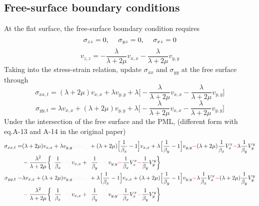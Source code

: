 \documentclass{article}
\newcommand{\myno}[1]{{\color{blue}#1}}
\newcommand{\mynno}[1]{{\color{red}#1}}
\newcommand{\myde}[1]{{\color{white!45!lightgray!55}#1}}
\begin{document}
\subsection{Free-surface boundary conditions}
At the flat surface, the free-surface boundary condition requires
\[ \sigma_{zz}=0 \text{,\hspace{5mm}} \sigma_{yz}=0 \text{,\hspace{5mm}} \sigma_{xz}=0 \]
\[ v_{z,z}=-\frac{\lambda}{\lambda+2\mu}v_{x,x}-\frac{\lambda}{\lambda+2\mu}v_{y,y} \]
Taking into the stress-strain relation, update $\sigma_{xx}$ and $\sigma_{yy}$ at the free surface through
\[ \sigma_{xx,t}=(\lambda+2\mu)v_{x,x}+\lambda v_{y,y}+\lambda\Big[-\frac{\lambda}{\lambda+2\mu}v_{x,x}-\frac{\lambda}{\lambda+2\mu}v_{y,y}\Big] \]
\[ \sigma_{yy,t}=\lambda v_{x,x}+(\lambda+2\mu)v_{y,y}+\lambda\Big[-\frac{\lambda}{\lambda+2\mu}v_{x,x}-\frac{\lambda}{\lambda+2\mu}v_{y,y}\Big] \]
Under the intersection of the free surface and the PML, \myno{(different form with eq.A-13 and A-14 in the original paper)}
\begin{align*}
  \sigma_{xx,t}= & (\lambda+2\mu)v_{x,x}+\lambda v_{y,y} \myde{+\lambda v_{z,z}} +(\lambda+2\mu)\Big[\frac{1}{\beta_x}-1\Big]v_{x,x}+\lambda\Big[\frac{1}{\beta_y}-1\Big]v_{y,y} \mynno{-} (\lambda+2\mu)\frac{1}{\beta_x}V_x^x \mynno{-} \lambda\frac{1}{\beta_y}V_y^y \\
    & -\frac{\lambda^2}{\lambda+2\mu}\bigg\{ \myde{\Big[} \frac{1}{\beta_x} \myde{-1\Big]} v_{x,x}+ \myde{\Big[} \frac{1}{\beta_y} \myde{-1\Big]} v_{y,y} \mynno{-} \frac{1}{\beta_x}V_x^x \mynno{-} \frac{1}{\beta_y}V_y^y\bigg\} \\
  \sigma_{yy,t}= & \lambda v_{x,x}+(\lambda+2\mu)v_{y,y} \myde{+\lambda v_{z,z}} +\lambda\Big[\frac{1}{\beta_x}-1\Big]v_{x,x}+(\lambda+2\mu)\Big[\frac{1}{\beta_y}-1\Big]v_{y,y} \mynno{-} \lambda\frac{1}{\beta_x}V_x^x \mynno{-} (\lambda+2\mu)\frac{1}{\beta_y}V_y^y \\
    & -\frac{\lambda^2}{\lambda+2\mu}\bigg\{ \myde{\Big[} \frac{1}{\beta_x} \myde{-1\Big]} v_{x,x}+ \myde{\Big[} \frac{1}{\beta_y} \myde{-1\Big]} v_{y,y} \mynno{-} \frac{1}{\beta_x}V_x^x \mynno{-} \frac{1}{\beta_y}V_y^y\bigg\} \\
\end{align*}
\end{document}
